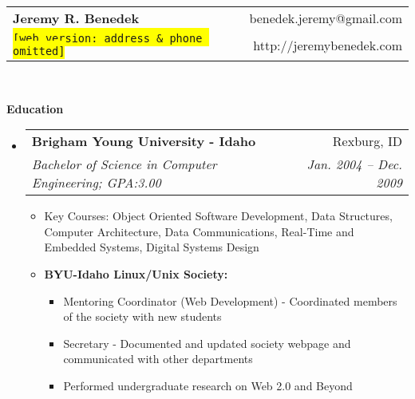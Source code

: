 \documentclass[letterpaper,11pt]{article}
\makeatletter
\newcommand{\resitem}[1]{\item #1 \vspace{-2pt}}
\newcommand{\resheading}[1]{{\large \colorbox{mygrey}{\begin{minipage}{\textwidth}{\textbf{#1 \vphantom{p\^{E}}}}\end{minipage}}}}
\newcommand{\ressubheading}[4]{
    \begin{tabular*}{6.5in}{l@{\extracolsep{\fill}}r}
      \textbf{#1} & #2 \\
      \textit{#3} & \textit{#4} \\
  \end{tabular*}\vspace{-6pt}}
\makeatother
\begin{document}
  \newcommand{\mywebheader}{
    \begin{tabular*}{7in}{l@{\extracolsep{\fill}}r}
      \textbf{\LARGE Jeremy R. Benedek} & benedek.jeremy@gmail.com\\
      {\footnotesize \texttt{\colorbox{yellow}{[web version:  address \& phone omitted]}}} & http://jeremybenedek.com \\
    \end{tabular*}
    \\
  \vspace{0.1in}}

  \mywebheader

  \resheading{Education}
  \begin{itemize}
    \item
      \ressubheading{Brigham Young University - Idaho}{Rexburg, ID}{Bachelor of Science in Computer Engineering; GPA:3.00}{Jan. 2004 -- Dec. 2009}
      { \footnotesize
	\begin{itemize}
	    \resitem{Key Courses: Object Oriented Software Development, Data Structures, Computer Architecture, Data Communications, Real-Time and Embedded Systems, Digital Systems Design}
	    \resitem{\textbf{BYU-Idaho Linux/Unix Society:}} 
	    \begin{itemize}
		\resitem{Mentoring Coordinator (Web Development) - Coordinated members of the society with new students}
		\resitem{Secretary - Documented and updated society webpage and communicated with other departments} 
		\resitem{Performed undergraduate research on Web 2.0 and Beyond}
	    \end{itemize}
	\end{itemize}
      }
  \end{itemize} %
\end{document}
